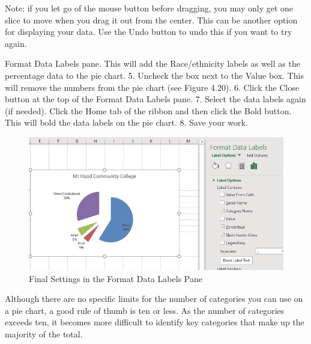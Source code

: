 Note: if you let go of the mouse button before dragging, you may only get one slice to move when you
drag it out from the center. This can be another option for displaying your data. Use the Undo button to
undo this if you want to try again.





Format Data Labels pane. This will add the Race/ethnicity labels as well as the percentage data
to the pie chart.
5.   Uncheck the box next to the Value box. This will remove the numbers from the pie chart (see
Figure 4.20).
6.   Click the Close button at the top of the Format Data Labels pane.
7.   Select the data labels again (if needed). Click the Home tab of the ribbon and then click the Bold
button. This will bold the data labels on the pie chart.
8.   Save your work.


\begin{figure}[H]
	\centering
	\includegraphics[width=\maxwidth{.95\linewidth}]{gfx/ch04_fig23}
	\caption{Final Settings in the Format Data Labels Pane}
	\label{04:fig23}
\end{figure}





Although there are no specific limits for the number of categories you can use on a pie chart, a good
rule of thumb is ten or less. As the number of categories exceeds ten, it becomes more difficult to
identify key categories that make up the majority of the total.



